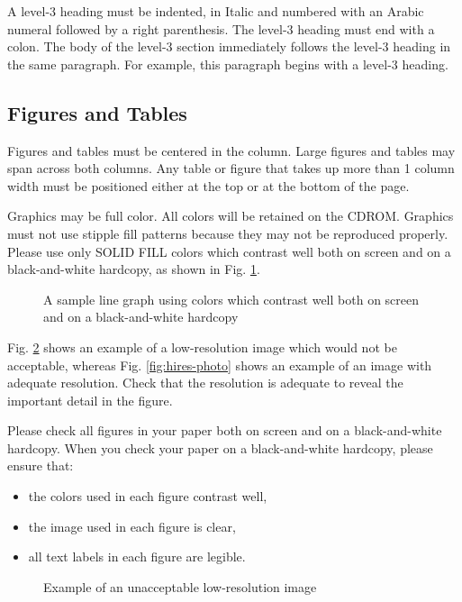 \documentclass[10pt,conference,a4paper]{IEEEtran}
\begin{document}
A level-3 heading must be indented, in Italic and numbered with an
Arabic numeral followed by a right parenthesis. The level-3 heading
must end with a colon.  The body of the level-3 section immediately
follows the level-3 heading in the same paragraph.  For example, this
paragraph begins with a level-3 heading.

\subsection{Figures and Tables}

Figures and tables must be centered in the column.  Large figures and
tables may span across both columns.  Any table or figure that takes
up more than 1 column width must be positioned either at the top or at
the bottom of the page.

Graphics may be full color.  All colors will be retained on the CDROM.
Graphics must not use stipple fill patterns because they may not be
reproduced properly.  Please use only SOLID FILL colors which contrast
well both on screen and on a black-and-white hardcopy, as shown in
Fig.  \ref{fig:sample_graph}.

\begin{figure}[h]
	\centerline{ }
	\caption{A sample line graph using colors which contrast well both on screen and on a black-and-white hardcopy}
	\label{fig:sample_graph}
\end{figure}

Fig. \ref{fig:lores-photo} shows an example of a low-resolution image
which would not be acceptable, whereas Fig.  \ref{fig:hires-photo}
shows an example of an image with adequate resolution.  Check that the
resolution is adequate to reveal the important detail in the figure.

Please check all figures in your paper both on screen and on a
black-and-white hardcopy.  When you check your paper on a
black-and-white hardcopy, please ensure that:

\begin{itemize}
\item	the colors used in each figure contrast well,
\item	the image used in each figure is clear,
\item	all text labels in each figure are legible.
\end{itemize}

\begin{figure}[h]
	\centerline{ }
	\caption{Example of an unacceptable low-resolution image}
	\label{fig:lores-photo}
\end{figure}
\end{document}
